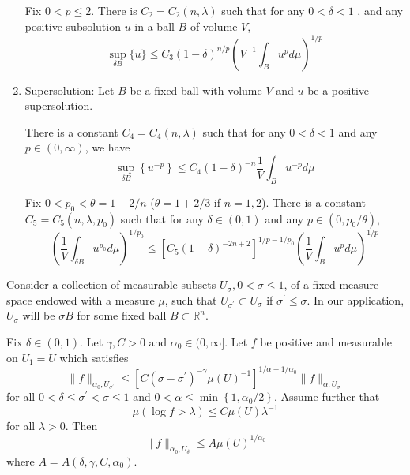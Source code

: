 \begin{enumerate}[label=\Roman*.]
	\begin{thm}
		Fix $0 < p \leq 2$. There is $C_2 = C_2(n,\lambda)$ such that for any $0 < \delta < 1$ , and any positive subsolution $u$ in a ball $B$ of volume $V$,
		\begin{equation*}
			\sup _{\delta B}\{u\} \leq C_3(1-\delta)^{n / p}\left(V^{-1} \int_B u^p d \mu\right)^{1 / p}
		\end{equation*}
	\end{thm}

	\item Supersolution: Let $B$ be a fixed ball with volume $V$ and $u$ be a positive supersolution.

	\begin{thm}
		There is a constant $C_4=C_4(n, \lambda)$ such that for any $0 < \delta < 1$ and any $p \in (0,\infty)$, we have
		\begin{equation*}
			\sup _{\delta B}\left\{u^{-p}\right\} \leq C_4(1-\delta)^{-n} \frac{1}{V} \int_B u^{-p} d \mu
		\end{equation*}
	\end{thm}

	\begin{thm}
		Fix $0<p_0<\theta=1+2 / n$ ($\theta = 1 + 2/3$ if $n=1,2$). There is a constant $C_5 = C_5(n,\lambda,p_0)$ such that for any $\delta \in (0,1)$ and any $p \in (0,p_0/\theta)$,
		\begin{equation*}
			\left(\frac{1}{V} \int_{\delta B} u^{p_0} d \mu\right)^{1 / p_0} \leq\left[C_5(1-\delta)^{-2 n+2}\right]^{1 / p-1 / p_0}\left(\frac{1}{V} \int_B u^p d \mu\right)^{1 / p}
		\end{equation*}
	\end{thm}
\end{enumerate}

\noindent Consider a collection of measurable subsets $U_\sigma, 0<\sigma \leq 1$, of a fixed measure space endowed with a measure $\mu$, such that $U_{\sigma^{\prime}} \subset U_\sigma$ if $\sigma^{\prime} \leq \sigma$. In our application, $U_\sigma$ will be $\sigma B$ for some fixed ball $B \subset \mathbb{R}^n$.

\begin{lem}
	Fix $\delta \in (0,1)$. Let $\gamma, C > 0$ and $\alpha_0 \in (0,\infty]$. Let $f$ be positive and measurable on $U_1 = U$ which satisfies
	\begin{equation*}
		\|f\|_{\alpha_0, U_{\sigma^{\prime}}} \leq\left[C\left(\sigma-\sigma^{\prime}\right)^{-\gamma} \mu(U)^{-1}\right]^{1 / \alpha-1 / \alpha_0}\|f\|_{\alpha, U_\sigma}
	\end{equation*}
	for all $0<\delta \leq \sigma^{\prime}<\sigma \leq 1$ and $0<\alpha \leq \min \left\{1, \alpha_0 / 2\right\}$. Assume further that 
	\begin{equation*}
		\mu(\log f>\lambda) \leq C \mu(U) \lambda^{-1}
	\end{equation*}
	for all $\lambda > 0$. Then
	\begin{equation*}
		\|f\|_{\alpha_0, U_\delta} \leq A \mu(U)^{1 / \alpha_0}
	\end{equation*}
	where $A=A(\delta,\gamma,C,\alpha_0)$.
\end{lem}

